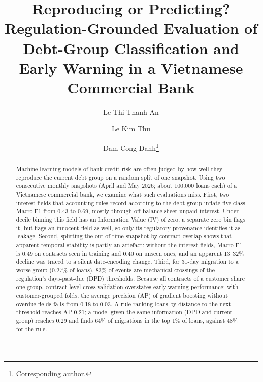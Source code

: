 \documentclass[runningheads]{llncs}
\begin{document}
\setlength{\emergencystretch}{1.5em}

\title{Reproducing or Predicting? Regulation-Grounded Evaluation of Debt-Group Classification and Early Warning in a Vietnamese Commercial Bank}

\author{Le Thi Thanh An \and
Le Kim Thu \and
Dam Cong Danh\thanks{Corresponding author.}}

\maketitle

\begin{abstract}
Machine-learning models of bank credit risk are often judged by how well they reproduce the current debt group on a random split of one snapshot. Using two consecutive monthly snapshots (April and May 2026; about 100,000 loans each) of a Vietnamese commercial bank, we examine what such evaluations miss. First, two interest fields that accounting rules record according to the debt group inflate five-class Macro-F1 from 0.43 to 0.69, mostly through off-balance-sheet unpaid interest. Under decile binning this field has an Information Value (IV) of zero; a separate zero bin flags it, but flags an innocent field as well, so only its regulatory provenance identifies it as leakage. Second, splitting the out-of-time snapshot by contract overlap shows that apparent temporal stability is partly an artefact: without the interest fields, Macro-F1 is 0.49 on contracts seen in training and 0.40 on unseen ones, and an apparent 13--32\% decline was traced to a silent date-encoding change. Third, for 31-day migration to a worse group (0.27\% of loans), 83\% of events are mechanical crossings of the regulation's days-past-due (DPD) thresholds. Because all contracts of a customer share one group, contract-level cross-validation overstates early-warning performance; with customer-grouped folds, the average precision (AP) of gradient boosting without overdue fields falls from 0.18 to 0.03. A rule ranking loans by distance to the next threshold reaches AP 0.21; a model given the same information (DPD and current group) reaches 0.29 and finds 64\% of migrations in the top 1\% of loans, against 48\% for the rule.

\end{abstract}
\end{document}
